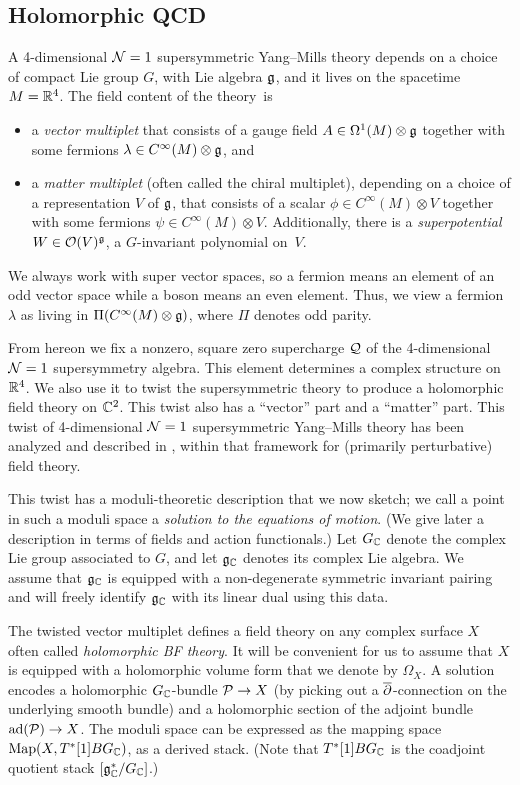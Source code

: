 \documentclass[11pt]{amsart}
\begin{document}
\subsection{Holomorphic QCD}

A 4-dimensional $\mathcal N=1$ supersymmetric Yang--Mills theory depends on a choice of compact Lie group $G$, with Lie algebra $\mathfrak g$, 
and it lives on  the spacetime $M=\mathbb R^4$.
The field content of the theory~is
\begin{itemize}
\item a {\it vector multiplet} that consists of a gauge field $A \in \Omega^1(M) \otimes \mathfrak g $ together with some fermions $\lambda \in C^\infty(M) \otimes \mathfrak g$, and
\item a {\it matter multiplet} (often called the chiral multiplet), depending on a choice of a representation $V$ of $\mathfrak g$, that consists of a scalar $\phi \in C^\infty(M) \otimes V$ together with some fermions $\psi \in C^\infty(M) \otimes V$. 
Additionally, there is a {\it superpotential} $W \in \mathcal O(V)^\mathfrak g$, a $G$-invariant polynomial on~$V$. 
\end{itemize}
We always work with super vector spaces, so a fermion means an element of an odd vector space while a boson means an even element.
Thus, we view a fermion $\lambda$ as living in $\Pi (C^\infty(M) \otimes \mathfrak g)$,
where $\Pi$ denotes odd parity.

From hereon we fix a nonzero, square zero supercharge $\mathcal Q$ of the 4-dimensional $\mathcal N=1$ supersymmetry algebra.
This element determines a complex structure on $\mathbb R^4$.
We also use it to twist the supersymmetric theory to produce a holomorphic field theory on $\mathbb C^2$.
This twist also has a ``vector'' part and a ``matter'' part.
This twist of 4-dimensional $\mathcal N=1$ supersymmetric Yang--Mills theory has been analyzed and described in \cite{CosYangian, ESW, SWchar}, within that framework for (primarily perturbative) field theory.

This twist has a moduli-theoretic description that we now sketch;
we call a point in such a moduli space a {\it solution to the equations of motion}. 
(We give later a description in terms of fields and action functionals.)
Let $G_\mathbb C$ denote the complex Lie group associated to $G$,
and let $\mathfrak g_\mathbb C$ denotes its complex Lie algebra.
We assume that $\mathfrak g_\mathbb C$ is equipped with a non-degenerate symmetric invariant pairing and will freely identify $\mathfrak g_\mathbb C$ with its linear dual using this data.

The twisted vector multiplet defines a field theory on any complex surface $X$ often called {\em holomorphic BF theory}. 
It will be convenient for us to assume that $X$ is equipped with a holomorphic volume form that we denote by $\Omega_X$. 
A solution encodes a holomorphic $G_\mathbb C$-bundle $\mathcal P \to X$ (by picking out a ${\overline{\partial}}$-connection on the underlying smooth bundle) and a holomorphic section of the adjoint bundle $\mathrm{ad}(\mathcal P) \to X$.
The moduli space can be expressed as the mapping space ${\rm Map}(X, T^*[1]BG_{\mathbb C})$, as a derived stack.
(Note that $T^*[1]BG_{\mathbb C}$ is the coadjoint quotient stack $[\mathfrak g_\mathbb C^*/G_{\mathbb C}]$.)
\end{document}
